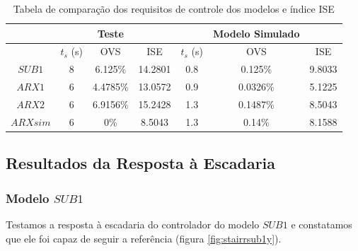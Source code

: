 \begin{table}[htb]
	\centering
	\begin{tabular}{|c|c|c|c|c|c|c|}
		\hline 
		&  & Teste &  &  & Modelo Simulado &  \\ 
		\hline 
		& $t_s$ (s) & OVS & ISE & $t_s$ (s) & OVS & ISE \\ 
		\hline 
		$SUB1$ & 8 & 6.125\% & 14.2801 & 0.8 & 0.125\% & 9.8033 \\ 
		\hline 
		$ARX1$ & 6 & 4.4785\% & 13.0572 & 0.9 & 0.0326\% & 5.1225 \\ 
		\hline 
		$ARX2$ & 6 & 6.9156\% & 15.2428 & 1.3 & 0.1487\% & 8.5043 \\ 
		\hline 
		$ARXsim$ & 6 & 0\% & 8.5043 & 1.3 & 0.14\% & 8.1588 \\ 
		\hline 
	\end{tabular}  
	\caption{Tabela de comparação dos requisitos de controle dos modelos e índice ISE}
	\label{tb:requisitosise}
\end{table}

\subsection{Resultados da Resposta à Escadaria}\label{rstair}

\subsubsection{Modelo $SUB1$}
Testamos a resposta à escadaria do controlador do modelo $SUB1$ e constatamos que ele foi capaz de seguir a referência (figura \ref{fig:stairrsub1y}).

